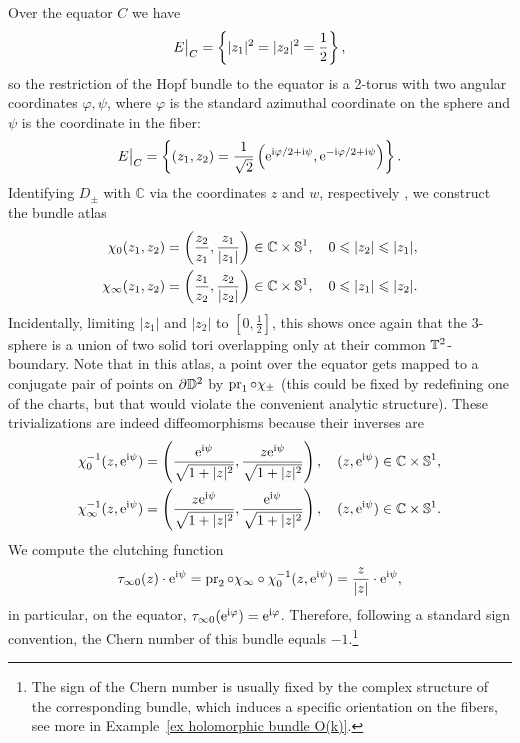 \begin{example}
    Over the equator $C$ we have 
    \[\restr{E}{C}=\left\{|z_1|^2=|z_2|^2=\frac12\right\},\]
    so the restriction of the Hopf bundle to the equator is a 2-torus with two angular coordinates $\varphi,\psi$, where $\varphi$ is the standard azimuthal coordinate on the sphere and $\psi$ is the coordinate in the fiber:
    \[\restr{E}{C}=\left\{(z_1,z_2)=\frac{1}{\sqrt{2}}\left(\rme^{\rmi\varphi/2+\rmi\psi},\rme^{-\rmi\varphi/2+\rmi\psi}\right)\right\}.\]
    Identifying $D_\pm$ with $\mathbb{C}$ via the coordinates $z$ and $w$, respectively , we construct the bundle atlas
    \begin{align}
        \chi_0(z_1,z_2)=\left(\frac{z_2}{z_1},\frac{z_1}{|z_1|}\right)\in \mathbb{C}\times \mathbb{S}^1,\quad 0\leqslant|z_2|\leqslant |z_1|,\\
        \chi_\infty(z_1,z_2)=\left(\frac{z_1}{z_2},\frac{z_2}{|z_2|}\right)\in \mathbb{C}\times \mathbb{S}^1,\quad 0\leqslant|z_1|\leqslant|z_2|.
    \end{align}
    Incidentally, limiting $|z_1|$ and $|z_2|$ to $[0,\frac12]$, this shows once again that the 3-sphere is a union of two solid tori overlapping only at their common $\mathbb{T}^2$-boundary. Note that in this atlas, a point over the equator gets mapped to a conjugate pair of points on $\partial\mathbb{D}^2$ by $\operatorname{pr}_1\circ \chi_\pm$ (this could be fixed by redefining one of the charts, but that would violate the convenient analytic structure). These trivializations are indeed diffeomorphisms because their inverses are
    \begin{align}
        \chi_0^{-1}(z,\mathrm{e}^{\mathrm{i}\psi})=\left(\frac{\mathrm{e}^{\mathrm{i}\psi}}{{\sqrt{1+|z|^2}}},\frac{z\mathrm{e}^{\mathrm{i}\psi}}{{\sqrt{1+|z|^2}}}\right),\quad (z,\mathrm{e}^{\mathrm{i}\psi})\in \mathbb{C}\times \mathbb{S}^1,\\
        \chi_\infty^{-1}(z,\mathrm{e}^{\mathrm{i}\psi})=\left(\frac{z\mathrm{e}^{\mathrm{i}\psi}}{{\sqrt{1+|z|^2}}},\frac{\mathrm{e}^{\mathrm{i}\psi}}{{\sqrt{1+|z|^2}}}\right),\quad (z,\mathrm{e}^{\mathrm{i}\psi})\in \mathbb{C}\times \mathbb{S}^1.
    \end{align}
    We compute the clutching function
    \[\tau_{\infty0}(z)\cdot \mathrm{e}^{\mathrm{i}\psi}=\operatorname{pr}_2\circ \chi_\infty\circ \chi_0^{-1}(z,\mathrm{e}^{\mathrm{i}\psi})=\frac{z}{|z|}\cdot \mathrm{e}^{\mathrm{i}\psi},\]
    in particular, on the equator, $\tau_{\infty0}(\mathrm{e}^{\mathrm{i}\varphi})=\mathrm{e}^{\mathrm{i}\varphi}$. Therefore, following a standard sign convention, the Chern number of this bundle equals $-1$.\footnote{The sign of the Chern number is usually fixed by the complex structure of the corresponding bundle, which induces a specific orientation on the fibers, see more in Example~\ref{ex holomorphic bundle O(k)}.}
\end{example}


